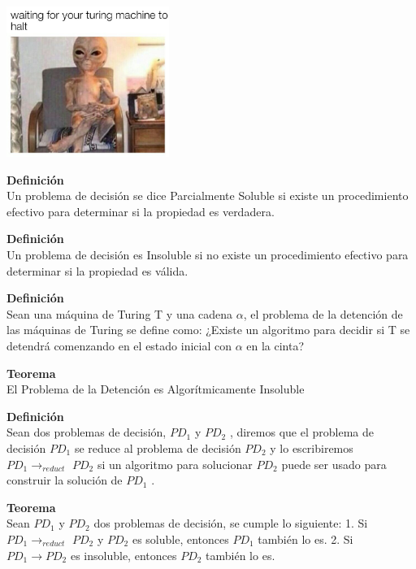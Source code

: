 \documentclass{beamer}                  %
\begin{document}
    \begin{frame}
    \center\includegraphics[width=200px]{halt}
    \endcenter 
    \end{frame}
    \begin{frame}

\textbf{Definición}\\
Un problema de decisión se dice Parcialmente Soluble si existe un procedimiento efectivo para determinar si la propiedad es verdadera.
    \bigskip

\textbf{Definición}\\
Un problema de decisión es Insoluble si no existe un procedimiento efectivo para determinar si la propiedad es válida.
    \bigskip

    \end{frame}
    \begin{frame}

\textbf{Definición}\\
Sean una máquina de Turing T y una cadena $\alpha$, el problema de la detención de las máquinas de Turing se define como: ¿Existe un algoritmo para decidir si T se detendrá comenzando en el estado inicial con $\alpha$ en la cinta?

    \bigskip
\textbf{Teorema}\\
El Problema de la Detención es Algorítmicamente Insoluble
    \bigskip
    \end{frame}
    \begin{frame}

\textbf{Definición}\\
Sean dos problemas de decisión, $PD_{1}$ y $PD_{2}$ , diremos que el problema de decisión $PD_{1}$ se reduce al problema de decisión $PD_{2}$ y lo escribiremos $PD_{1}\rightarrow_{reduct}$ $PD_{2}$ si un algoritmo para
solucionar $PD_{2}$ puede ser usado para construir la solución de
$PD_{1}$ .
    \bigskip

\textbf{Teorema}\\

Sean $PD_{1}$ y $PD_{2}$ dos problemas de decisión, se cumple lo siguiente:
1. Si $PD_{1} \rightarrow_{reduct}$ $PD_{2}$ y $PD_{2}$ es soluble, entonces $PD_{1}$
también lo es.
2. Si $PD_{1} \rightarrow PD_{2}$ es insoluble, entonces $PD_{2}$ también lo es.

    \end{frame}


\printbibliography
\clearpage
\end{document}
